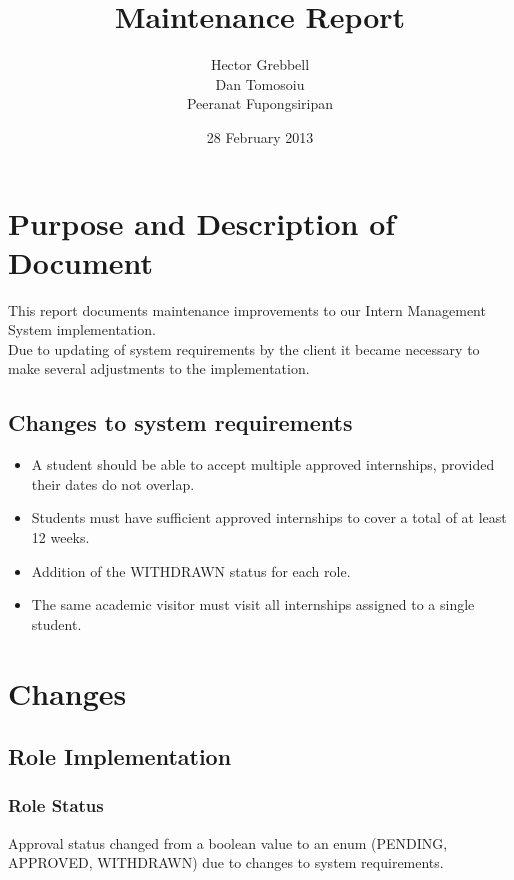 \documentclass{l3deliverable}
\title{Maintenance Report}
\author{Hector Grebbell \\
        Dan Tomosoiu \\
        Peeranat Fupongsiripan
        }
\date{28 February 2013}
\begin{document}

\maketitle

\tableofcontents

\newpage


\section{Purpose and Description of Document}
This report documents maintenance improvements to our Intern Management System implementation. \\
Due to updating of system requirements by the client it became necessary to make several adjustments to the implementation.\\

\subsection{Changes to system requirements}

\begin{itemize}
\item A student should be able to accept multiple approved internships, provided their dates do not overlap.
\item Students must have sufficient approved internships to cover a total of at least 12 weeks.
\item Addition of the WITHDRAWN status for each role.
\item The same academic visitor must visit all internships assigned to a single student.
\end{itemize}

\section{Changes}

\subsection{Role Implementation}

\subsubsection{Role Status}
Approval status changed from a boolean value to an enum (PENDING, APPROVED, WITHDRAWN) due to changes to system requirements.
\end{document}
